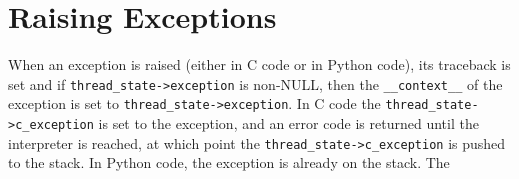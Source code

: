 \documentclass[a4paper,10pt]{article}
\begin{document}
\section{Raising Exceptions}

When an exception is raised (either in C code or in Python code), its traceback is set and if \verb|thread_state->exception| is non-NULL, then the \verb|__context__| of the exception is set to \verb|thread_state->exception|. In C code the \verb|thread_state->c_exception| is set to the exception, and an error code is returned until the interpreter is reached, at which point the \verb|thread_state->c_exception| is pushed to the stack. In Python code, the exception is already on the stack.
The 
\end{document}
